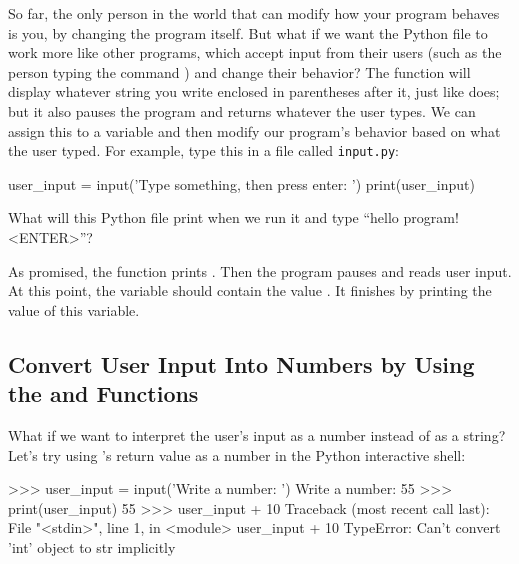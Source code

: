 \documentclass[11pt]{cselabheader}
\begin{document}
So far, the only person in the world that can modify how your program
behaves is you, by changing the program itself.  But what if we want
the Python file to work more like other programs, which accept input
from their users (such as the person typing the command
) and change their behavior?
The function  will display whatever string you
write enclosed in parentheses after it, just like
 does; but it also pauses the program and
returns whatever the user types. We can assign this to a variable
and then modify our program's behavior based on what the user typed.
For example, type this in a file called \texttt{input.py}:

\begin{python3code}
user_input = input('Type something, then press enter: ')
print(user_input)
\end{python3code}

What will this Python file print when we run it and type
``hello program! <ENTER>''?


As promised, the function  prints
.
Then the program pauses and reads user input.
At this point, the variable  should contain the
value .
It finishes by printing the value of this variable.

\subsection{\texorpdfstring%
  {Convert User Input Into Numbers by Using the  and  Functions}
  {Convert User Input Into Numbers by Using the int() and float() Functions}}

What if we want to interpret the user's input as a number instead of
as a string?  Let's try using 's return value as
a number in the Python interactive shell:

\begin{pyconcode}
>>> user_input = input('Write a number: ')
Write a number: 55
>>> print(user_input)
55
>>> user_input + 10
Traceback (most recent call last):
  File "<stdin>", line 1, in <module>
    user_input + 10
TypeError: Can't convert 'int' object to str implicitly

\end{pyconcode}
\end{document}
